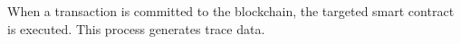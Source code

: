 When a transaction is committed to the blockchain, the targeted smart contract is executed.
This process generates trace data.
